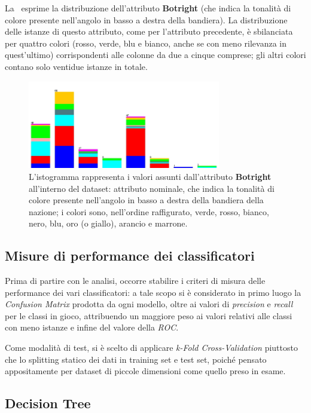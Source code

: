 \documentclass[a4paper,11pt,twoside,notitlepage,final]{scrartcl}
\begin{document}
La~ esprime la distribuzione dell'attributo \textbf{Botright} (che indica la tonalità di colore presente nell'angolo in basso a destra della bandiera).
La distribuzione delle istanze di questo attributo, come per l'attributo precedente, è sbilanciata per quattro colori (rosso, verde, blu e bianco, anche se con meno rilevanza in quest'ultimo) corrispondenti alle colonne da due a cinque comprese; gli altri colori contano solo ventidue istanze in totale.

\begin{figure}[H]
  \centering
  \includegraphics[width=0.75\textwidth]{fig/religion-botright.jpg}%
  \caption{%
    L'istogramma rappresenta i valori assunti dall'attributo \textbf{Botright}
    all'interno del dataset: attributo nominale, che indica la tonalità di colore presente nell'angolo in basso a destra della bandiera della nazione;
    i colori sono, nell'ordine raffigurato, verde, rosso, bianco, nero, blu, oro (o giallo), arancio e marrone.
    }%
  \label{fig:botright}
\end{figure}

\subsection{Misure di performance dei classificatori}

Prima di partire con le analisi, occorre stabilire i criteri di misura delle performance dei vari classificatori:
a tale scopo si è considerato in primo luogo la \emph{Confusion Matrix} prodotta da ogni modello, oltre ai valori di \emph{precision} e \emph{recall} per le classi in gioco, attribuendo un maggiore peso ai valori relativi alle classi con meno istanze e infine del valore della \emph{ROC}\@.

Come modalità di test, si è scelto di applicare \emph{k-Fold Cross-Validation} piuttosto che lo splitting statico dei dati in training set e test set, poiché pensato appositamente per dataset di piccole dimensioni come quello preso in esame.


\subsection{Decision Tree}\label{subsec:tree}
\end{document}
